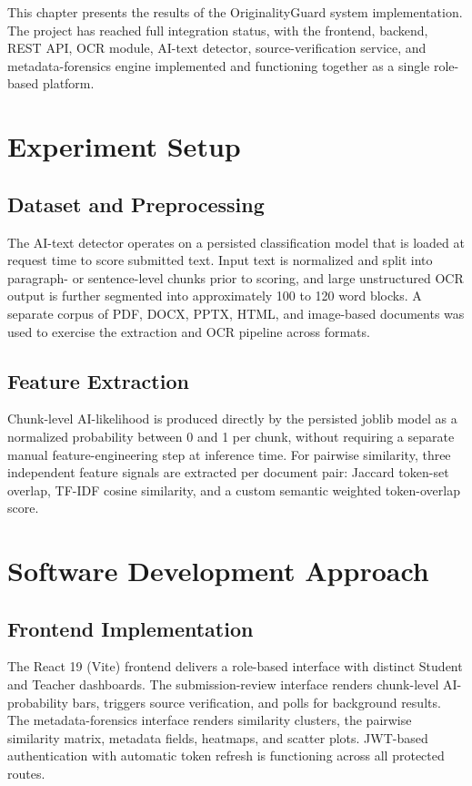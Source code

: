 \documentclass[12pt, a4paper]{report}
\numberwithin{equation}{chapter}
\begin{document}
This chapter presents the results of the OriginalityGuard system implementation. The project has reached full integration status, with the frontend, backend, REST API, OCR module, AI-text detector, source-verification service, and metadata-forensics engine implemented and functioning together as a single role-based platform.

\section{Experiment Setup}

\subsection{Dataset and Preprocessing}

The AI-text detector operates on a persisted classification model that is loaded at request time to score submitted text. Input text is normalized and split into paragraph- or sentence-level chunks prior to scoring, and large unstructured OCR output is further segmented into approximately 100 to 120 word blocks. A separate corpus of PDF, DOCX, PPTX, HTML, and image-based documents was used to exercise the extraction and OCR pipeline across formats.

\subsection{Feature Extraction}

Chunk-level AI-likelihood is produced directly by the persisted joblib model as a normalized probability between 0 and 1 per chunk, without requiring a separate manual feature-engineering step at inference time. For pairwise similarity, three independent feature signals are extracted per document pair: Jaccard token-set overlap, TF-IDF cosine similarity, and a custom semantic weighted token-overlap score.

\section{Software Development Approach}

\subsection{Frontend Implementation}

The React 19 (Vite) frontend delivers a role-based interface with distinct Student and Teacher dashboards. The submission-review interface renders chunk-level AI-probability bars, triggers source verification, and polls for background results. The metadata-forensics interface renders similarity clusters, the pairwise similarity matrix, metadata fields, heatmaps, and scatter plots. JWT-based authentication with automatic token refresh is functioning across all protected routes.
\end{document}
